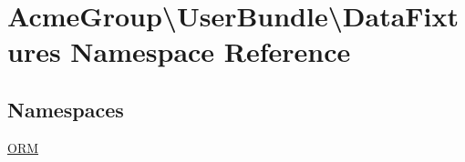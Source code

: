 \hypertarget{namespace_acme_group_1_1_user_bundle_1_1_data_fixtures}{\section{Acme\+Group\textbackslash{}User\+Bundle\textbackslash{}Data\+Fixtures Namespace Reference}
\label{namespace_acme_group_1_1_user_bundle_1_1_data_fixtures}
}
\subsection*{Namespaces}
\begin{DoxyCompactItemize}
\item 
 \hyperlink{namespace_acme_group_1_1_user_bundle_1_1_data_fixtures_1_1_o_r_m}{O\+R\+M}
\end{DoxyCompactItemize}
